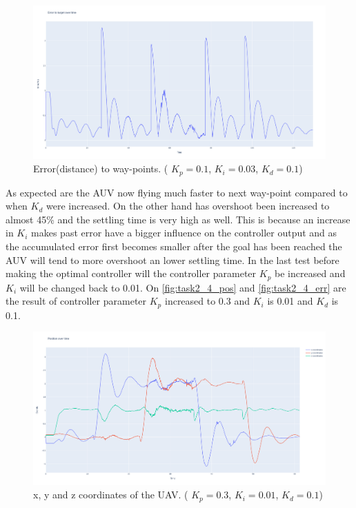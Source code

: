 \documentclass[conference]{IEEEtran}
\begin{document}
\begin{figure}[hbtp]
	\centering
	\includegraphics[width=1.0\linewidth]{images/task2_3_err.png}
	\caption{Error(distance) to way-points. ( $K_p = 0.1$, $K_i = 0.03$, $K_d = 0.1$)}
	\label{fig:task2_3_err}
\end{figure}

As expected are the AUV now flying much faster to next way-point compared to when $K_d$ were increased. On the other hand has overshoot been increased to almost 45\% and the settling time is very high as well. This is because an increase in $K_i$ makes past error have a bigger influence on the controller output and as the accumulated error first becomes smaller after the goal has been reached the AUV will tend to more overshoot an lower settling time. 
In the last test before making the optimal controller will the controller parameter $K_p$ be increased and $K_i$ will be changed back to 0.01. On \cref{fig:task2_4_pos} and \cref{fig:task2_4_err} are the result of controller parameter $K_p$ increased to 0.3 and $K_i$ is 0.01 and $K_d$ is 0.1.

\begin{figure}[hbtp]
	\centering
	\includegraphics[width=1.0\linewidth]{images/task2_2_pos.png}
	\caption{x, y and z coordinates of the UAV. ( $K_p = 0.3$, $K_i = 0.01$, $K_d = 0.1$)}
	\label{fig:task2_2_pos}
\end{figure}
\end{document}
